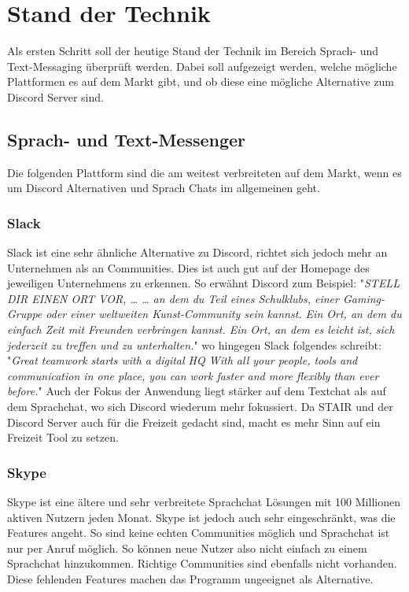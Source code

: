 \documentclass[a4paper, table]{article}
\begin{document}
\newpage
\section{Stand der Technik}\label{state-of-the-art}
Als ersten Schritt soll der heutige Stand der Technik im Bereich Sprach- und Text-Messaging überprüft werden.
Dabei soll aufgezeigt werden, welche mögliche Plattformen es auf dem Markt gibt, und ob diese eine mögliche Alternative zum Discord Server sind.

\subsection{Sprach- und Text-Messenger}
Die folgenden Plattform sind die am weitest verbreiteten auf dem Markt, wenn es um Discord Alternativen und Sprach Chats im allgemeinen geht. \autocite{noauthor_discord-alternativen_nodate}

\subsubsection*{Slack}
Slack ist eine sehr ähnliche Alternative zu Discord, richtet sich jedoch mehr an Unternehmen als an Communities.
Dies ist auch gut auf der Homepage des jeweiligen Unternehmens zu erkennen.
So erwähnt Discord zum Beispiel: "\textit{STELL DIR EINEN ORT VOR, …
… an dem du Teil eines Schulklubs, einer Gaming-Gruppe oder einer weltweiten Kunst-Community sein kannst. Ein Ort, an dem du einfach Zeit mit Freunden verbringen kannst. Ein Ort, an dem es leicht ist, sich jederzeit zu treffen und zu unterhalten.}" \autocite{noauthor_discord_nodate}
wo hingegen Slack folgendes schreibt: "\textit{Great teamwork starts with a digital HQ
With all your people, tools and communication in one place, you can work faster and more flexibly than ever before.}"\autocite{slack_slack_nodate}
Auch der Fokus der Anwendung liegt stärker auf dem Textchat als auf dem Sprachchat, wo sich Discord wiederum mehr fokussiert.\autocite{noauthor_slack_nodate}
Da STAIR und der Discord Server auch für die Freizeit gedacht sind, macht es mehr Sinn auf ein Freizeit Tool zu setzen.

\subsubsection*{Skype}
Skype ist eine ältere und sehr verbreitete Sprachchat Lösungen mit 100 Millionen aktiven Nutzern jeden Monat. \autocite{lardinois_microsoft_2020}
Skype ist jedoch auch sehr eingeschränkt, was die Features angeht.
So sind keine echten Communities möglich und Sprachchat ist nur per Anruf möglich.
So können neue Nutzer also nicht einfach zu einem Sprachchat hinzukommen.
Richtige Communities sind ebenfalls nicht vorhanden. \autocite{mattise_discord_2022}
Diese fehlenden Features machen das Programm ungeeignet als Alternative.
\end{document}
